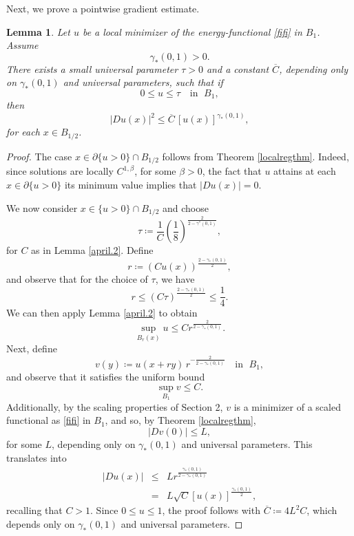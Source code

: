 \documentclass[reqno,11pt]{amsart}
\newtheorem{lemma}{Lemma}[section]
\newcommand{\1}{\mathds{1}}
\numberwithin{equation}{section}
\begin{document}
Next, we prove a pointwise gradient estimate.

\begin{lemma}\label{pt grad estimate} 
Let $u$ be a local minimizer of the energy-functional \eqref{fifi} in $B_1$. Assume 
$$
    \gamma_\ast (0,1)>0.
$$
There exists a small universal parameter $\tau>0$ and a constant $\overline{C}$, depending only on $\gamma_\ast (0,1)$ and universal parameters, such that if
\begin{equation}\label{1608}
0 \leq u \leq \tau \quad \text{in } \; B_1,
\end{equation}
then
\begin{equation}\label{gradest}
    |Du(x)|^2 \le \overline{C}\, [u(x)]^{\gamma_\ast(0,1)},
\end{equation}
for each $x \in B_{1/2}$.
\end{lemma}

\begin{proof}
The case $x \in \partial\{u>0\} \cap B_{1/2}$ follows from Theorem \ref{localregthm}. Indeed, since solutions are locally $C^{1,\beta}$, for some $\beta>0$, the fact that $u$ attains at each $x\in \partial\{u>0\}$ its minimum value implies that $|Du(x)|=0$. 

We now consider $x \in \{u>0\} \cap B_{1/2}$ and choose
$$
    \tau\coloneqq \frac{1}{C}\left( \frac{1}{8} \right)^{\frac{2}{2-\gamma^\ast(0,1)}},
$$
for $C$ as in Lemma \ref{april.2}. Define
$$
	r \coloneqq (C u(x))^{\frac{2-\gamma_{\ast}(0,1)}{2}},
$$
and observe that for the choice of $\tau$, we have
$$
	r \leq (C \tau)^{\frac{2-\gamma_{\ast}(0,1)}{2}} \leq \frac{1}{4}.
$$
We can then apply Lemma \ref{april.2} to obtain
$$
	\sup_{B_r(x)} u \leq C r^{\frac{2}{2-\gamma_\ast(0,1)}}.
$$
Next, define 
$$
    v(y) \coloneqq  u(x+ry)\,r^{-\frac{2}{2-\gamma_\ast(0,1)}} \quad \text{in } \; B_1,
$$
and observe that it satisfies the uniform bound
$$
    \sup_{B_1} v \leq C.
$$
Additionally, by the scaling properties of Section 2, $v$ is a minimizer of a scaled functional as \eqref{fifi} in $B_1$, and so, by Theorem \ref{localregthm},
$$
    \left| Dv (0) \right| \leq L,
$$
for some $L$, depending only on $\gamma_\ast(0,1)$ and universal parameters. This translates into
\begin{eqnarray*}
\left|Du(x)\right| & \leq & L r^{\frac{\gamma_\ast(0,1)}{2-\gamma_\ast(0,1)}} \\
& = & L \sqrt{C} [u(x)]^{\frac{\gamma_\ast(0,1)}{2}},
\end{eqnarray*}
recalling that $C>1$. Since $0\leq u \leq 1$, the proof follows with $\overline{C} \coloneqq 4L^2C$, which depends only on $\gamma_\ast(0,1)$ and universal parameters.
\end{proof}
\end{document}
